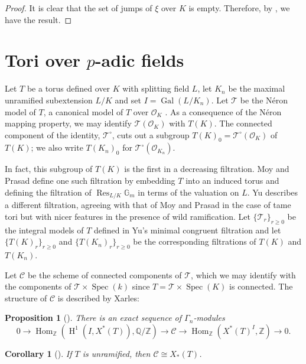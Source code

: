 \documentclass[11pt]{amsart}
\theoremstyle{plain}
\newtheorem{proposition}[theorem]{Proposition}
\newtheorem{corollary}[theorem]{Corollary}
\theoremstyle{definition}
\DeclareMathOperator{\Gal}{Gal}
\DeclareMathOperator{\HH}{H}
\DeclareMathOperator{\Hom}{Hom}
\DeclareMathOperator{\Spec}{Spec}
\DeclareMathOperator{\Res}{Res}
\newcommand{\TT}{\mathcal{T}}
\newcommand{\C}{\mathcal{C}}
\newcommand{\OK}{\mathcal{O}_K}
\newcommand{\OKn}{\mathcal{O}_{K_n}}
\newcommand{\ZZ}{\mathbb{Z}}
\newcommand{\QQ}{\mathbb{Q}}
\newcommand{\Gm}{\mathbb{G}_m}
\begin{document}
\begin{proof}
It is clear that the set of jumps of $\xi$ over $K$ is empty.
Therefore, by \cite[Proposition 21]{bushnell-henniart:10a}, we have the result.
\end{proof}

\section{Tori over $p$-adic fields} \label{section:padic_tori}

Let $T$ be a torus defined over $K$ with splitting field $L$, let $K_n$ be the maximal
unramified subextension $L/K$ and set $I = \Gal(L/K_n)$.
Let $\TT$ be the N\'eron model of $T$, a canonical model of $T$
over $\OK$ \cite[Ch. 10]{bosch-lutkebohmert-reynaud:NeronModels}.
As a consequence of the N\'eron mapping
property, we may identify $\TT(\OK)$ with $T(K)$.  The connected
component of the identity, $\TT^\circ$, cuts out a subgroup
$T(K)_0 = \TT^\circ(\OK)$ of $T(K)$; we also write $T(K_n)_0$ for
$\TT^\circ(\OKn)$.

In fact, this subgroup of $T(K)$ is the first in a decreasing filtration.
Moy and Prasad \cite{moy-prasad:96a}
define one such filtration by
embedding $T$ into an induced torus and defining the filtration of
$\Res_{L/K} \Gm$ in terms of the valuation on $L$.  Yu \cite[\S 5]{yu:03a}
describes a different filtration, agreeing with that of Moy and Prasad
in the case of tame tori but with nicer features in the presence of wild
ramification.  Let $\{\TT_r\}_{r \ge 0}$ be the integral models of $T$ defined in Yu's
minimal congruent filtration and let $\{T(K)_r\}_{r \ge 0}$ and
$\{T(K_n)_r\}_{r \ge 0}$ be the corresponding filtrations of $T(K)$ and
$T(K_n)$.

Let $\C$ be the scheme of
connected components of $\TT$,
which we may identify with the
components of $\TT \times \Spec(k)$ since $T = \TT \times \Spec(K)$
is connected.  The structure of $\C$ is described by Xarles:

\begin{proposition}[{\cite[Cor. 2.12]{xarles:93a}}]
There is an exact sequence of $\Gamma_n$-modules
$$0 \rightarrow \Hom_{\ZZ}(\HH^1(I, X^*(T)), \QQ/\ZZ) \rightarrow
\C \rightarrow \Hom_{\ZZ}(X^*(T)^I, \ZZ) \rightarrow 0.$$
\end{proposition}

\begin{corollary}[{\cite[Thm. 1.1]{xarles:93a}}] \label{cor:unram_components}
If $T$ is unramified, then $\C \cong X_*(T)$.
\end{corollary}
\end{document}

